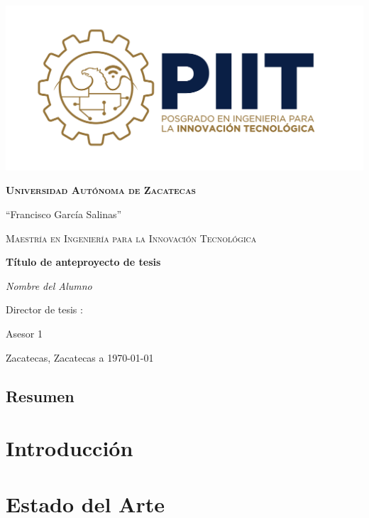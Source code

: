 \documentclass[10pt,letterpaper]{report}
\begin{document}
	\begin{titlepage}
		\centering
		\includegraphics[width=.7\textwidth]{Imagenes/Logo.png}\par\vspace{1cm}
		{\scshape\LARGE \bfseries Universidad Autónoma de Zacatecas \par 
        ``Francisco García Salinas''\par }
		\vspace{1cm}
        {\scshape\Large Maestría en Ingeniería para la Innovación Tecnológica\par}
		\vspace{1.5cm}
		{\huge\bfseries Título de anteproyecto de tesis\par}
		\vspace{2cm}
		{\Large\itshape Nombre del Alumno\par}
		\vfill
		Director de tesis :\par
		Asesor 1\par
				
		\vfill
		
		{\large Zacatecas, Zacatecas a \today\par}
	\end{titlepage}

\section*{Resumen}

\lipsum[1-3]

\tableofcontents
	
\chapter{Introducción}

\lipsum[1-3]

\chapter{Estado del Arte}
\end{document}
